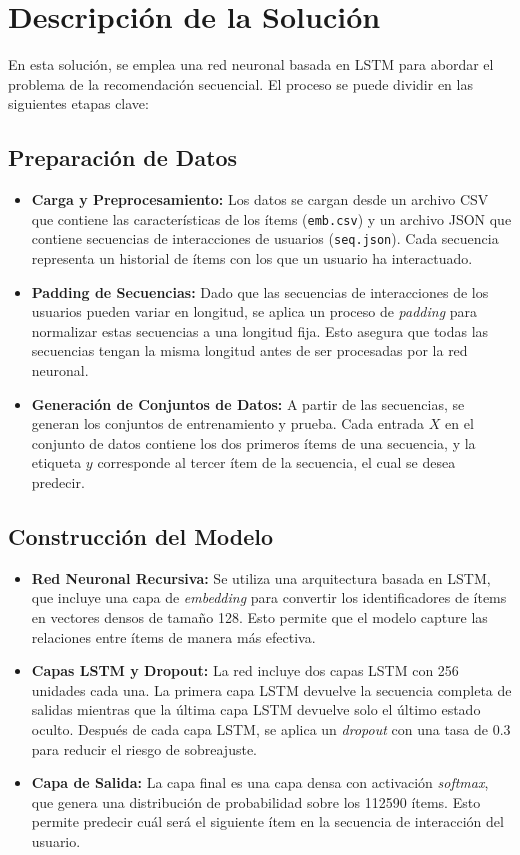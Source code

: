 \documentclass[runningheads]{llncs}
\begin{document}
\section{Descripción de la Solución}

En esta solución, se emplea una red neuronal basada en LSTM para abordar el problema de la recomendación secuencial. El proceso se puede dividir en las siguientes etapas clave:

\subsection{Preparación de Datos}

\begin{itemize}
    \item \textbf{Carga y Preprocesamiento:} Los datos se cargan desde un archivo CSV que contiene las características de los ítems (\texttt{emb.csv}) y un archivo JSON que contiene secuencias de interacciones de usuarios (\texttt{seq.json}). Cada secuencia representa un historial de ítems con los que un usuario ha interactuado.
    \item \textbf{Padding de Secuencias:} Dado que las secuencias de interacciones de los usuarios pueden variar en longitud, se aplica un proceso de \textit{padding} para normalizar estas secuencias a una longitud fija. Esto asegura que todas las secuencias tengan la misma longitud antes de ser procesadas por la red neuronal.
    \item \textbf{Generación de Conjuntos de Datos:} A partir de las secuencias, se generan los conjuntos de entrenamiento y prueba. Cada entrada $X$ en el conjunto de datos contiene los dos primeros ítems de una secuencia, y la etiqueta $y$ corresponde al tercer ítem de la secuencia, el cual se desea predecir.
\end{itemize}

\subsection{Construcción del Modelo}

\begin{itemize}
    \item \textbf{Red Neuronal Recursiva:} Se utiliza una arquitectura basada en LSTM, que incluye una capa de \textit{embedding} para convertir los identificadores de ítems en vectores densos de tamaño 128. Esto permite que el modelo capture las relaciones entre ítems de manera más efectiva.
    \item \textbf{Capas LSTM y Dropout:} La red incluye dos capas LSTM con 256 unidades cada una. La primera capa LSTM devuelve la secuencia completa de salidas mientras que la última capa LSTM devuelve solo el último estado oculto. Después de cada capa LSTM, se aplica un \textit{dropout} con una tasa de 0.3 para reducir el riesgo de sobreajuste.
    \item \textbf{Capa de Salida:} La capa final es una capa densa con activación \textit{softmax}, que genera una distribución de probabilidad sobre los 112590 ítems. Esto permite predecir cuál será el siguiente ítem en la secuencia de interacción del usuario.
\end{itemize}
\end{document}
